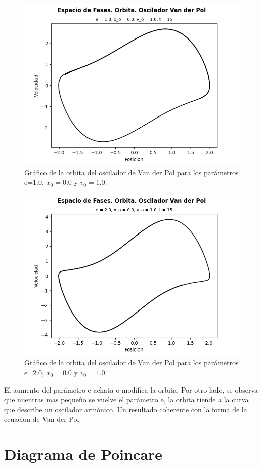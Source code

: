 \documentclass{article}
\begin{document}
	\begin{figure}[h!]
		\centering
		\ContinuedFloat
		\includegraphics[width=0.7\linewidth]{ESPACIO FASE. ORBITA. e=1.0}
		\caption{Gr\'afico de la orbita del oscilador de Van der Pol para los par\'ametros e=1.0, $x_0=0.0$ y $v_0=1.0$.}
	\end{figure}
	
	\begin{figure}[h!]
		\centering
		\ContinuedFloat
		\includegraphics[width=0.7\linewidth]{ESPACIO FASE. ORBITA. e=2.0}
		\caption{Gr\'afico de la orbita del oscilador de Van der Pol para los par\'ametros e=2.0, $x_0=0.0$ y $v_0=1.0$.}
	\end{figure}
	
	El aumento del parámetro e achata o modifica la orbita. Por otro lado, se observa que mientras mas pequeño se vuelve el parámetro e, la orbita tiende a la curva que describe un oscilador armónico. Un resultado coherente con la forma de la ecuacion de Van der Pol.
	
	\newpage
	
	
	\section{Diagrama de Poincare}
	
\end{document}
